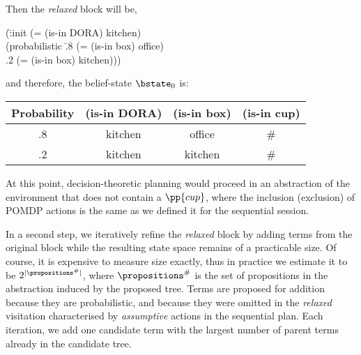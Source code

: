 \noindent Then the {\em relaxed} block will be,

\small
\begin{tabtt}
(\=:init (= (is-in DORA) kitchen) \+ \\
       (probabilistic \=.8 (= (is-in box) office)  \\
		      \>.2 (= (is-in box) kitchen))) \\
\end{tabtt}
\normalsize

\noindent and therefore, the belief-state $\bstate_0$ is:

\small
\begin{tabular}{cccc}
\hline
Probability & (is-in DORA)  & (is-in box)  & (is-in cup) \\
\hline
.8 & kitchen & office & \# \\
.2 & kitchen & kitchen & \# \\
\hline
\end{tabular}
\normalsize

\noindent At this point, decision-theoretic planning would proceed in an
abstraction of the environment that does not contain a $\pp{cup}$,
where the inclusion (exclusion) of POMDP actions is the same as we
defined it for the sequential session.

In a second step, we iteratively refine the {\em relaxed} block by
adding terms from the original block while the resulting state space
remains of a practicable size. Of course, it is expensive to measure
size exactly, thus in practice we estimate it to be
$2^{|\propositions^\#|}$, where $\propositions^\#$ is the set of
propositions in the abstraction induced by the proposed tree. Terms
are proposed for addition because they are probabilistic, and because
they were omitted in the {\em relaxed} visitation characterised by
{\em assumptive} actions in the sequential plan. Each iteration, we
add one candidate term with the largest number of parent terms already
in the candidate tree.








